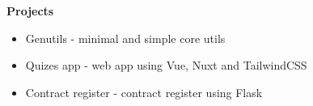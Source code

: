 {\vspace{0.5cm} \hspace{-0.5cm} \Large \textbf{Projects}}

\begin{itemize}
    \item{Genutils - minimal and simple core utils}
    \item{Quizes app - web app using Vue, Nuxt and TailwindCSS}
    \item{Contract register - contract register using Flask}
\end{itemize}